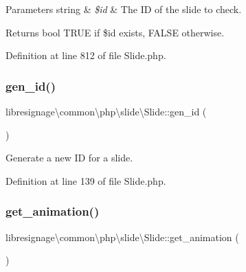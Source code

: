 \begin{DoxyParams}[1]{Parameters}
string & {\em \$id} & The ID of the slide to check.\\
\hline
\end{DoxyParams}
\begin{DoxyReturn}{Returns}
bool T\+R\+UE if \$id exists, F\+A\+L\+SE otherwise. 
\end{DoxyReturn}


Definition at line 812 of file Slide.\+php.

\mbox{\label{classlibresignage_1_1common_1_1php_1_1slide_1_1Slide_ab6e0fba0384a41c75f45dacb6b0e2140}} 
\subsubsection{\texorpdfstring{gen\+\_\+id()}{gen\_id()}}
{\footnotesize\ttfamily libresignage\textbackslash{}common\textbackslash{}php\textbackslash{}slide\textbackslash{}\+Slide\+::gen\+\_\+id (\begin{DoxyParamCaption}{ }\end{DoxyParamCaption})}

Generate a new ID for a slide. 

Definition at line 139 of file Slide.\+php.

\mbox{\label{classlibresignage_1_1common_1_1php_1_1slide_1_1Slide_afebda5baca0de598672e044bf501da1f}} 
\subsubsection{\texorpdfstring{get\+\_\+animation()}{get\_animation()}}
{\footnotesize\ttfamily libresignage\textbackslash{}common\textbackslash{}php\textbackslash{}slide\textbackslash{}\+Slide\+::get\+\_\+animation (\begin{DoxyParamCaption}{ }\end{DoxyParamCaption})}



